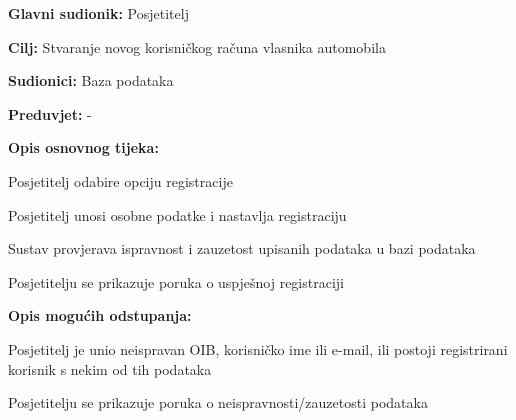 \noindent {}
\begin{packed_item}
	
	\item \textbf{Glavni sudionik: } Posjetitelj
	\item  \textbf{Cilj:} Stvaranje novog korisničkog računa vlasnika
	automobila
	\item  \textbf{Sudionici:} Baza podataka
	\item  \textbf{Preduvjet:} -
	\item  \textbf{Opis osnovnog tijeka:} 
	
	\item[] \begin{packed_enum}
		
		\item Posjetitelj odabire opciju registracije
		\item Posjetitelj unosi osobne podatke i nastavlja registraciju
		\item Sustav provjerava ispravnost i zauzetost upisanih podataka u bazi podataka
		\item Posjetitelju se prikazuje poruka o uspješnoj registraciji
	\end{packed_enum}
	
	\item  \textbf{Opis mogućih odstupanja:}
	
	\item[] \begin{packed_item}
		
		\item[3.a] Posjetitelj je unio neispravan OIB, korisničko ime ili e-mail,
		ili postoji registrirani korisnik s nekim od tih podataka
		\item[] \begin{packed_enum}
			
			\item Posjetitelju se prikazuje poruka o neispravnosti/zauzetosti
			podataka
			
		\end{packed_enum}
		
	\end{packed_item}
\end{packed_item}

